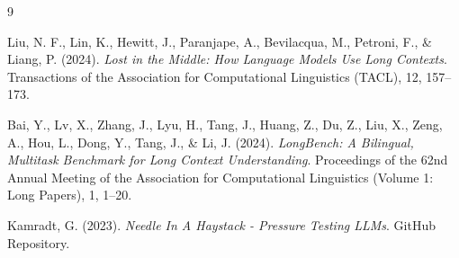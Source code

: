 \documentclass[11pt,a4paper]{article}
\begin{document}
\begin{thebibliography}{9}

Liu, N. F., Lin, K., Hewitt, J., Paranjape, A., Bevilacqua, M., Petroni, F., \& Liang, P. (2024).
\textit{Lost in the Middle: How Language Models Use Long Contexts}.
Transactions of the Association for Computational Linguistics (TACL), 12, 157--173.

Bai, Y., Lv, X., Zhang, J., Lyu, H., Tang, J., Huang, Z., Du, Z., Liu, X., Zeng, A., Hou, L., Dong, Y., Tang, J., \& Li, J. (2024).
\textit{LongBench: A Bilingual, Multitask Benchmark for Long Context Understanding}.
Proceedings of the 62nd Annual Meeting of the Association for Computational Linguistics (Volume 1: Long Papers), 1, 1--20.

Kamradt, G. (2023).
\textit{Needle In A Haystack - Pressure Testing LLMs}.
GitHub Repository.

\end{thebibliography}
\end{document}
